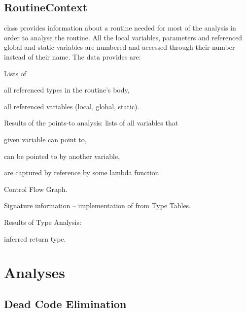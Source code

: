         \subsection{RoutineContext}
        
         class provides information about a routine 
        needed for most of the analysis in order to analyse the routine. 
        All the local variables, parameters and referenced global and 
        static variables are numbered and accessed through their number 
        instead of their name. The data  provides are:
        
        \begin{itemize*}
            \item Lists of
                \begin{itemize*}
                    \item all referenced types in the routine's body,
                    \item all referenced variables (local, global, static).
                \end{itemize*}
            \item Results of the points-to analysis: lists of all variables that
                \begin{itemize*}
                    \item given variable can point to, 
                    \item can be pointed to by another variable, 
                    \item are captured by reference by some lambda function.
                \end{itemize*}
            \item Control Flow Graph.
            \item Signature information -- implementation of  from Type Tables.
            \item Results of Type Analysis:
                \begin{itemize*}
                    \item inferred return type.
                \end{itemize*}
        \end{itemize*}
        
    
    \section{Analyses}
        \subsection{Dead Code Elimination}
        
